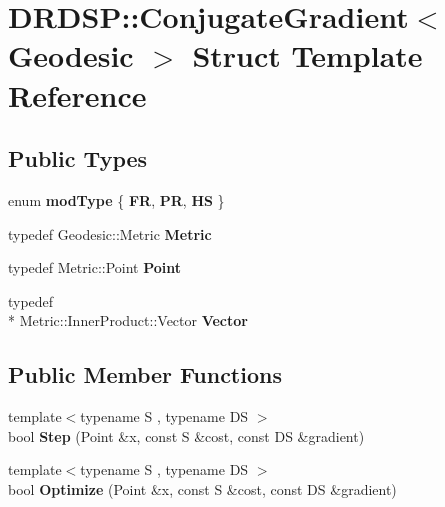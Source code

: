 \hypertarget{struct_d_r_d_s_p_1_1_conjugate_gradient}{\section{D\-R\-D\-S\-P\-:\-:Conjugate\-Gradient$<$ Geodesic $>$ Struct Template Reference}
\label{struct_d_r_d_s_p_1_1_conjugate_gradient}
}
\subsection*{Public Types}
\begin{DoxyCompactItemize}
\item 
enum {\bfseries mod\-Type} \{ {\bfseries F\-R}, 
{\bfseries P\-R}, 
{\bfseries H\-S}
 \}
\item 
\hypertarget{struct_d_r_d_s_p_1_1_conjugate_gradient_a8e0530e6eb42ec794636928afa96bcf3}{typedef Geodesic\-::\-Metric {\bfseries Metric}}\label{struct_d_r_d_s_p_1_1_conjugate_gradient_a8e0530e6eb42ec794636928afa96bcf3}

\item 
\hypertarget{struct_d_r_d_s_p_1_1_conjugate_gradient_aa2b56058b24948111e1e0af905ba4804}{typedef Metric\-::\-Point {\bfseries Point}}\label{struct_d_r_d_s_p_1_1_conjugate_gradient_aa2b56058b24948111e1e0af905ba4804}

\item 
\hypertarget{struct_d_r_d_s_p_1_1_conjugate_gradient_aa3b0207ecee13952f4bcae716852a805}{typedef \\*
Metric\-::\-Inner\-Product\-::\-Vector {\bfseries Vector}}\label{struct_d_r_d_s_p_1_1_conjugate_gradient_aa3b0207ecee13952f4bcae716852a805}

\end{DoxyCompactItemize}
\subsection*{Public Member Functions}
\begin{DoxyCompactItemize}
\item 
\hypertarget{struct_d_r_d_s_p_1_1_conjugate_gradient_a50cc2feb8470b14e487e4900a0729531}{{\footnotesize template$<$typename S , typename D\-S $>$ }\\bool {\bfseries Step} (Point \&x, const S \&cost, const D\-S \&gradient)}\label{struct_d_r_d_s_p_1_1_conjugate_gradient_a50cc2feb8470b14e487e4900a0729531}

\item 
\hypertarget{struct_d_r_d_s_p_1_1_conjugate_gradient_afb69550164e1851bfef45b0819d329be}{{\footnotesize template$<$typename S , typename D\-S $>$ }\\bool {\bfseries Optimize} (Point \&x, const S \&cost, const D\-S \&gradient)}\label{struct_d_r_d_s_p_1_1_conjugate_gradient_afb69550164e1851bfef45b0819d329be}

\end{DoxyCompactItemize}
